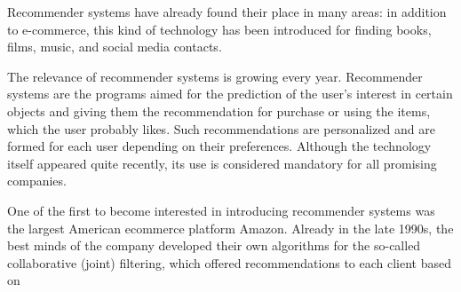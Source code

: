 \documentclass[10pt, a4paper]{article}
\begin{document}
\begin{multicols}{2}
Recommender systems have already found their place
in many areas: in addition to e-commerce, this kind of
technology has been introduced for finding books, films,
music, and social media contacts.

The relevance of recommender systems is growing
every year. Recommender systems are the programs aimed
for the prediction of the user’s interest in certain objects
and giving them the recommendation for purchase or
using the items, which the user probably likes. Such
recommendations are personalized and are formed for
each user depending on their preferences. Although
the technology itself appeared quite recently, its use is
considered mandatory for all promising companies.

One of the first to become interested in introducing
recommender systems was the largest American ecommerce platform Amazon. Already in the late 1990s,
the best minds of the company developed their own
algorithms for the so-called collaborative (joint) filtering,
which offered recommendations to each client based on
\end{multicols}
\end{document}
